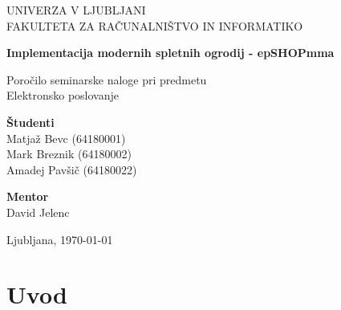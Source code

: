 \documentclass[a4paper,12pt]{report}
\newcommand{\naslov}     {Implementacija modernih spletnih ogrodij - epSHOPmma}
\newcommand{\prviavtor}  {Matjaž Bevc}
\newcommand{\prviindeks} {64180001}
\newcommand{\drugiavtor} {Mark Breznik}
\newcommand{\drugiindeks}{64180002}
\newcommand{\tretjiavtor} {Amadej Pavšič}
\newcommand{\tretjiindeks}{64180022}
\newcommand{\kraj}       {Ljubljana}
\begin{document}
\begin{titlepage}
	\begin{center}
	{UNIVERZA V LJUBLJANI\\[10pt] 
	FAKULTETA ZA RAČUNALNIŠTVO IN INFORMATIKO}

	\vspace{65mm}

	{\Large\textbf{\naslov}}

	\vspace{10mm}

	{\large Poročilo seminarske naloge pri predmetu\\[10pt] Elektronsko poslovanje}

	\vfill
	\vspace{60mm}

\hspace{20mm}
\begin{minipage}[t]{60mm}
	{\bf Študenti}\\
	{\prviavtor} ({\prviindeks})\\ 
	{\drugiavtor} ({\drugiindeks})\\
	{\tretjiavtor} ({\tretjiindeks})
\end{minipage}
\begin{minipage}[t]{50mm}
	{\bf Mentor}\\
	David Jelenc
\end{minipage}

	\vspace{25mm}

	{	\kraj, \today}
	\end{center}
\end{titlepage}


\tableofcontents


\chapter{Uvod}
\end{document}
